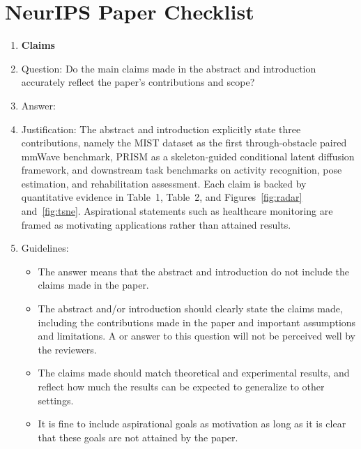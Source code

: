 \section*{NeurIPS Paper Checklist}

\begin{enumerate}

\item {\bf Claims}
    \item[] Question: Do the main claims made in the abstract and introduction accurately reflect the paper's contributions and scope?
    \item[] Answer: \answerYes{}
    \item[] Justification: The abstract and introduction explicitly state three contributions, namely the MIST dataset as the first through-obstacle paired mmWave benchmark, PRISM as a skeleton-guided conditional latent diffusion framework, and downstream task benchmarks on activity recognition, pose estimation, and rehabilitation assessment. Each claim is backed by quantitative evidence in Table~1, Table~2, and Figures~\ref{fig:radar} and~\ref{fig:tsne}. Aspirational statements such as healthcare monitoring are framed as motivating applications rather than attained results.
    \item[] Guidelines:
    \begin{itemize}
        \item The answer \answerNA{} means that the abstract and introduction do not include the claims made in the paper.
        \item The abstract and/or introduction should clearly state the claims made, including the contributions made in the paper and important assumptions and limitations. A \answerNo{} or \answerNA{} answer to this question will not be perceived well by the reviewers.
        \item The claims made should match theoretical and experimental results, and reflect how much the results can be expected to generalize to other settings.
        \item It is fine to include aspirational goals as motivation as long as it is clear that these goals are not attained by the paper.
    \end{itemize}


\end{enumerate}
